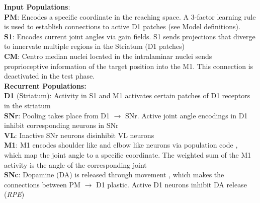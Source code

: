 \justifying
\textbf{\textcolor{training-set}{Input Populations}}:\\[4pt]
\footnotesize
\textbf{PM}: Encodes a specific coordinate in the reaching space. A 3-factor learning rule is used to establish connections to active D1 patches (see Model definitions).\\[2pt]
\textbf{S1}: Encodes current joint angles via gain fields. S1 sends projections that diverge to innervate multiple regions in the Striatum (D1 patches) \parencite{flahertyCorticostriatalTransformationsPrimate1991}\\[2pt]
\textbf{CM}: Centro median nuclei located in the intralaminar nuclei sends proprioceptive information of the target position into the M1. This connection is deactivated in the test phase.\\[10pt]
\small
\textbf{Recurrent Populations:}\\[4pt]
\footnotesize
\textbf{D1} (Striatum): Activity in S1 and M1 activates certain patches of D1 receptors in the striatum\\[2pt]
\textbf{SNr}: Pooling takes place from D1 $\rightarrow$ SNr. Active joint angle encodings in D1 inhibit corresponding neurons in SNr\\[2pt]
\textbf{VL}: Inactive SNr neurons disinhibit VL neurons\\[2pt]
\textbf{M1}: M1 encodes shoulder like and elbow like neurons via population code 
\parencite{pruszynskiPrimaryMotorCortex2011}, which map the joint angle to a specific coordinate. The weighted sum of the M1 activity is the angle of the corresponding joint\\[2pt]
\textbf{SNc}: Dopamine (DA) is released through movement \parencite{cheungLearningCriticallyDrives2023}, which makes the connections between PM $\rightarrow$ D1 plastic. Active D1 neurons inhibit DA release (\textit{RPE})
